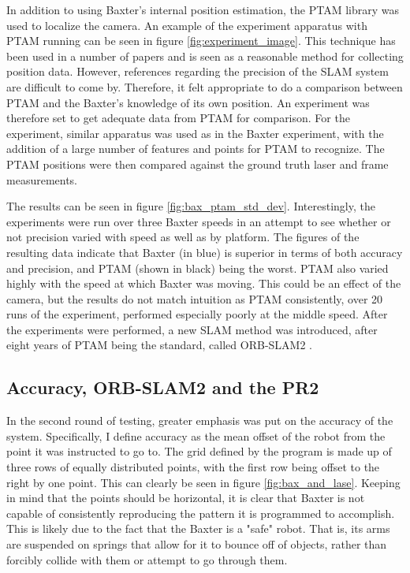 \documentclass[12pt]{report}
\begin{document}
In addition to using Baxter's internal position estimation, the PTAM library was used to localize the camera. An example of the experiment apparatus with PTAM running can be seen in figure \ref{fig:experiment_image}. This technique has been used in a number of papers and is seen as a reasonable method for collecting position data. However, references regarding the precision of the SLAM system are difficult to come by. Therefore, it felt appropriate to do a comparison between PTAM and the Baxter's knowledge of its own position. An experiment was therefore set to get adequate data from PTAM for comparison. For the experiment, similar apparatus was used as in the Baxter experiment, with the addition of a large number of features and points for PTAM to recognize. The PTAM positions were then compared against the ground truth laser and frame measurements. 

The results can be seen in figure \ref{fig:bax_ptam_std_dev}. Interestingly, the experiments were run over three Baxter speeds in an attempt to see whether or not precision varied with speed as well as by platform. The figures of the resulting data indicate that Baxter (in blue) is superior in terms of both accuracy and precision, and PTAM (shown in black) being the worst. PTAM also varied highly with the speed at which Baxter was moving. This could be an effect of the camera, but the results do not match intuition as PTAM consistently, over 20 runs of the experiment, performed especially poorly at the middle speed. After the experiments were performed, a new SLAM method was introduced, after eight years of PTAM being the standard, called ORB-SLAM2 \cite{Mur-Artal15}.

\subsection{Accuracy, ORB-SLAM2 and the PR2}
In the second round of testing, greater emphasis was put on the accuracy of the system. Specifically, I define accuracy as the mean offset of the robot from the point it was instructed to go to. The grid defined by the program is made up of three rows of equally distributed points, with the first row being offset to the right by one point. This can clearly be seen in figure \ref{fig:bax_and_lase}. Keeping in mind that the points should be horizontal, it is clear that Baxter is not capable of consistently reproducing the pattern it is programmed to accomplish. This is likely due to the fact that the Baxter is a "safe" robot. That is, its arms are suspended on springs that allow for it to bounce off of objects, rather than forcibly collide with them or attempt to go through them.
\end{document}
